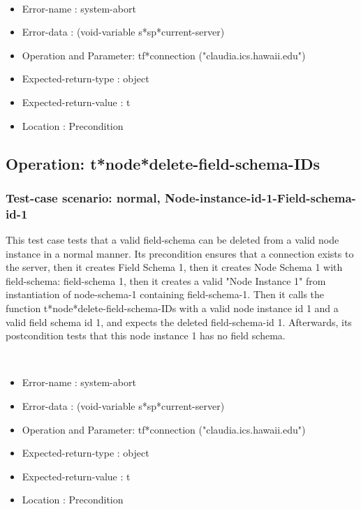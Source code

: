 \
\begin {itemize}
\item 	Error-name             : system-abort
\item Error-data             : (void-variable s*sp*current-server)
\item Operation and Parameter: tf*connection ("claudia.ics.hawaii.edu")
\item Expected-return-type   : object
\item Expected-return-value  : t
\item Location               : Precondition



\end {itemize}
\subsection {Operation: t*node*delete-field-schema-IDs}
\subsubsection {Test-case scenario: normal, Node-instance-id-1-Field-schema-id-1}


This test case tests that a valid field-schema can be deleted from a valid node instance in a normal manner.
Its precondition ensures that a connection exists to the server, then it creates Field Schema 1, then it creates Node Schema 1 with field-schema: field-schema 1, then it creates a valid "Node Instance 1" from instantiation of node-schema-1 containing field-schema-1.
Then it calls the function t*node*delete-field-schema-IDs  with a valid node instance id 1 and a valid field schema id 1, and expects the deleted field-schema-id 1.
Afterwards, its postcondition tests that this node instance 1 has no field schema.


\
\begin {itemize}
\item 	Error-name             : system-abort
\item Error-data             : (void-variable s*sp*current-server)
\item Operation and Parameter: tf*connection ("claudia.ics.hawaii.edu")
\item Expected-return-type   : object
\item Expected-return-value  : t
\item Location               : Precondition



\end {itemize}
